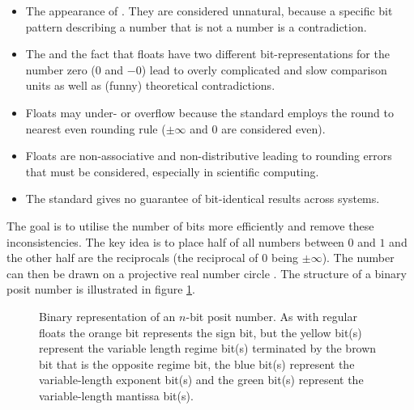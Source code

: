 \documentclass{article}
\theoremstyle{plain} %
\theoremstyle{convention} %
\theoremstyle{remark} %
\numberwithin{equation}{section}
\begin{document}
\begin{itemize}
    \item The appearance of . They are considered unnatural, because a specific bit pattern describing a number that is not a number is a contradiction.
    \item The  and the fact that floats have two different bit-representations for the number zero ($0$ and $-0$) lead to overly complicated and slow comparison units as well as (funny) theoretical contradictions\footnotemark.


    \item Floats may under- or overflow because the standard employs the round to nearest even rounding rule ($\pm \infty$ and $0$ are considered even).
    \item Floats are non-associative and non-distributive \footnotemark leading to rounding errors that must be considered, especially in scientific computing.
    \item The standard gives no guarantee of bit-identical results across systems.
\end{itemize}



The goal is to utilise the number of bits more efficiently and remove these inconsistencies. The key idea is to place half of all numbers between $0$ and $1$ and the other half are the reciprocals (the reciprocal of $0$ being $\pm \infty$). The number can then be drawn on a projective real number circle \cite{gustafson2017}. The structure of a binary posit number is illustrated in figure \ref{fig:posit}.

\begin{figure}[H]
  \caption{Binary representation of an $n$-bit posit number. As with regular floats the \textcolor{corange}{orange} bit represents the \textcolor{corange}{sign bit}, but the \textcolor{cyellow}{yellow} bit(s) represent the variable length \textcolor{cyellow}{regime bit(s)} terminated by the \textcolor{cbrown}{brown} bit that is the \textcolor{cbrown}{opposite regime bit}, the \textcolor{cblue}{blue} bit(s) represent the variable-length \textcolor{cblue}{exponent bit(s)} and the \textcolor{cgreen}{green} bit(s) represent the variable-length \textcolor{cgreen}{mantissa bit(s)}.}
  \label{fig:posit}
\end{figure}
\end{document}
